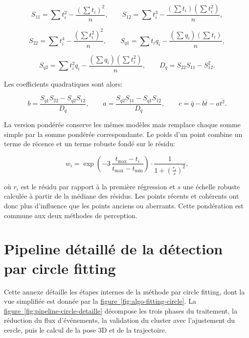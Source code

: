 \documentclass[a4paper,11pt]{report}
\newcommand{\figref}[1]{\hyperref[#1]{figure~\ref*{#1}}}
\begin{document}
\begin{equation}
S_{11} = \sum t_i^2 - \frac{\left(\sum t_i\right)^2}{n},
\qquad
S_{12} = \sum t_i^3 - \frac{\left(\sum t_i\right)\left(\sum t_i^2\right)}{n},
\label{eq:mc-quad-a}
\end{equation}

\begin{equation}
S_{22} = \sum t_i^4 - \frac{\left(\sum t_i^2\right)^2}{n},
\qquad
S_{q1} = \sum t_i q_i - \frac{\left(\sum q_i\right)\left(\sum t_i\right)}{n},
\label{eq:mc-quad-b}
\end{equation}

\begin{equation}
S_{q2} = \sum t_i^2 q_i - \frac{\left(\sum q_i\right)\left(\sum t_i^2\right)}{n},
\qquad
D_q = S_{22}S_{11} - S_{12}^2.
\label{eq:mc-quad-c}
\end{equation}

Les coefficients quadratiques sont alors:

\begin{equation}
b = \frac{S_{q1}S_{22} - S_{q2}S_{12}}{D_q},
\qquad
a = \frac{S_{q2}S_{11} - S_{q1}S_{12}}{D_q},
\qquad
c = \bar{q} - b\bar{t} - a\overline{t^2}.
\label{eq:mc-quad-coeffs}
\end{equation}

La version pondérée conserve les mêmes modèles mais remplace chaque somme simple par la somme pondérée correspondante. Le poids d'un point combine un terme de récence et un terme robuste fondé sur le résidu:

\begin{equation}
w_i =
\exp\left(-3\,\frac{t_{\max}-t_i}{t_{\max}-t_{\min}}\right)
\cdot
\frac{1}{1+\left(\frac{r_i}{s}\right)^2},
\label{eq:poids-regression}
\end{equation}

où \(r_i\) est le résidu par rapport à la première régression et \(s\) une échelle robuste calculée à partir de la médiane des résidus. Les points récents et cohérents ont donc plus d'influence que les points anciens ou aberrants. Cette pondération est commune aux deux méthodes de perception.

\chapter{Pipeline détaillé de la détection par circle fitting}
\label{ann:pipeline-circle}

Cette annexe détaille les étapes internes de la méthode par circle fitting, dont la vue simplifiée est donnée par la \figref{fig:algo-fitting-circle}. La \figref{fig:pipeline-circle-detaille} décompose les trois phases du traitement, la réduction du flux d'événements, la validation du cluster avec l'ajustement du cercle, puis le calcul de la pose 3D et de la trajectoire.
\end{document}
